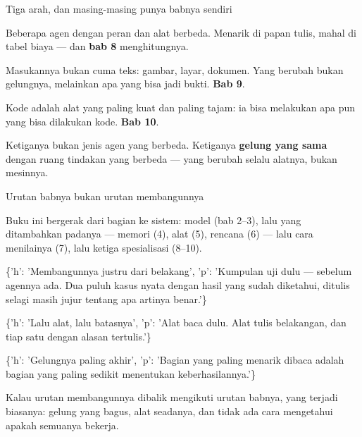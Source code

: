 \documentclass[aspectratio=169,11pt,t]{beamer}
\begin{document}
\begin{frame}[shrink=25]{Tiga arah, dan masing-masing punya babnya sendiri}
\begin{minipage}[t]{0.3253\textwidth}
\begin{icardaccent}
Beberapa agen dengan peran dan alat berbeda. Menarik di papan tulis, mahal di tabel biaya --- dan \textbf{bab 8} menghitungnya.
\end{icardaccent}
\end{minipage}%
\hfill
\begin{minipage}[t]{0.3253\textwidth}
\begin{icardaccent}
Masukannya bukan cuma teks: gambar, layar, dokumen. Yang berubah bukan gelungnya, melainkan apa yang bisa jadi bukti. \textbf{Bab 9}.
\end{icardaccent}
\end{minipage}%
\hfill
\begin{minipage}[t]{0.3253\textwidth}
\begin{icardaccent}
Kode adalah alat yang paling kuat dan paling tajam: ia bisa melakukan apa pun yang bisa dilakukan kode. \textbf{Bab 10}.
\end{icardaccent}
\end{minipage}%
{\fontsize{9.4}{12.6}\selectfont\color{fg2}Ketiganya bukan jenis agen yang berbeda. Ketiganya \textbf{gelung yang sama} dengan ruang tindakan yang berbeda --- yang berubah selalu alatnya, bukan mesinnya.\par}\vskip 4pt
\end{frame}

\begin{frame}[shrink=25]{Urutan babnya bukan urutan membangunnya}
{\fontsize{9.4}{12.6}\selectfont\color{fg2}Buku ini bergerak dari bagian ke sistem: model (bab 2--3), lalu yang ditambahkan padanya --- memori (4), alat (5), rencana (6) --- lalu cara menilainya (7), lalu ketiga spesialisasi (8--10).\par}\vskip 4pt
\begin{isteps}
\item \{'h': 'Membangunnya justru dari belakang', 'p': 'Kumpulan uji dulu --- sebelum agennya ada. Dua puluh kasus nyata dengan hasil yang sudah diketahui, ditulis selagi masih jujur tentang apa artinya benar.'\}
\item \{'h': 'Lalu alat, lalu batasnya', 'p': 'Alat baca dulu. Alat tulis belakangan, dan tiap satu dengan alasan tertulis.'\}
\item \{'h': 'Gelungnya paling akhir', 'p': 'Bagian yang paling menarik dibaca adalah bagian yang paling sedikit menentukan keberhasilannya.'\}
\end{isteps}
\begin{iband}[signal]
Kalau urutan membangunnya dibalik mengikuti urutan babnya, yang terjadi biasanya: gelung yang bagus, alat seadanya, dan tidak ada cara mengetahui apakah semuanya bekerja.
\end{iband}
\end{frame}
\end{document}
